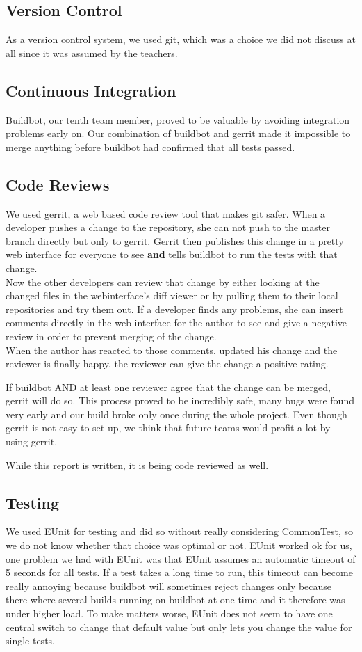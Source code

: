 \documentclass[11pt,a4paper]{report}
\begin{document}
\subsection*{Version Control}
As a version control system, we used git, which was a choice we did not discuss
at all since it was assumed by the teachers.

\subsection*{Continuous Integration}
Buildbot, our tenth team member, proved to be valuable by avoiding integration
problems early on.
Our combination of buildbot and gerrit made it impossible to merge anything
before buildbot had confirmed that all tests passed.
\subsection*{Code Reviews}
We used gerrit, a web based code review tool that makes git safer.
When a developer pushes a change to the repository, she can not push to the
master branch directly but only to gerrit. Gerrit then publishes this change in
a pretty web interface for everyone to see {\bf and} tells buildbot to run
the tests with that change. \\
Now the other developers can review that change by either looking at the changed
files in the webinterface's diff viewer or by pulling them to their local
repositories and try them out.
If a developer finds any problems, she can insert comments directly in the 
web interface for the author to see and give a negative review in order to
prevent merging of the change. \\
When the author has reacted to those comments, updated his change and the
reviewer is finally happy, the reviewer can give the change a positive rating.

If buildbot AND at least one reviewer agree that the change can be merged,
gerrit will do so.
This process proved to be incredibly safe, many bugs were found very early and
our build broke only once during the whole project.
Even though gerrit is not easy to set up, we think that future teams would
profit a lot by using gerrit.

While this report is written, it is being code reviewed as well.

\subsection*{Testing}
We used EUnit for testing and did so without really considering
CommonTest, so we do not know whether that choice was optimal or not.
EUnit worked ok for us, one problem we had with EUnit was that EUnit assumes
an automatic timeout of 5 seconds for all tests. If a test takes a long time
to run, this timeout can become really annoying because buildbot will sometimes
reject changes only because there where several builds running on buildbot at
one time and it therefore was under higher load. To make matters worse, EUnit
does not seem to have one central switch to change that default value but only
lets you change the value for single tests.
\end{document}
